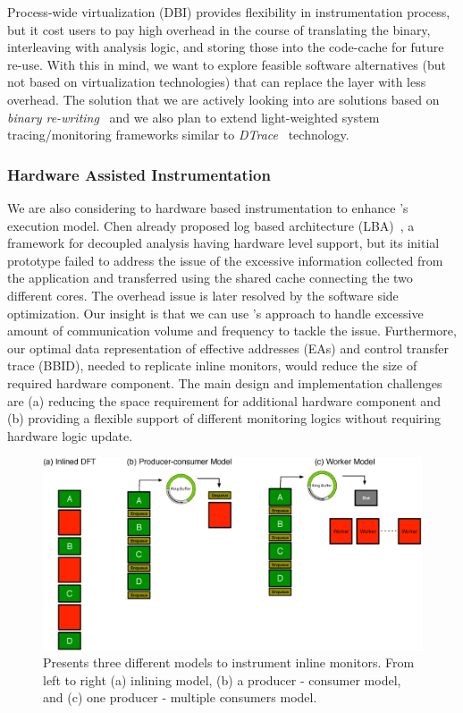 Process-wide virtualization (\ie DBI) provides flexibility in instrumentation
process, but it cost users to pay high overhead in the course of translating
the binary, interleaving with analysis logic, and storing those into the code-cache
for future re-use. With this in mind, we want to explore feasible
software alternatives (but not based on virtualization technologies)
that can replace the layer with less overhead. The solution that we are actively
looking into are solutions based on {\it binary re-writing}~\cite{cfi,
brewriting:usenix2003} and we also plan to extend light-weighted system
tracing/monitoring frameworks similar to {\it DTrace}~\cite{DTrace} technology.

\subsubsection{Hardware Assisted Instrumentation} 
\label{ssec:hw_inst}

We are also considering to hardware based instrumentation to enhance
\sreplica's execution model. Chen \etal already proposed log based architecture
(LBA)~\cite{lba:isca2008}, a framework for decoupled analysis having hardware
level support, but its initial prototype failed to address the issue of the
excessive information collected from the application and transferred using the
shared cache connecting the two different cores. The overhead issue is later
resolved by the software side optimization. 
%
Our insight is that we can use \sreplica's approach to handle excessive amount
of communication volume and frequency to tackle the issue. Furthermore, our
optimal data representation of effective addresses (EAs) and control transfer
trace (BBID), needed to replicate inline monitors, would reduce the size of
required hardware component.
%
The main design and implementation challenges are (a) reducing the space
requirement for additional hardware component and (b) providing a flexible
support of different monitoring logics without requiring hardware logic update.

\begin{figure}[tb]
    \centering
    \includegraphics[width=0.90\linewidth]{figs/model0.eps}

    \caption{Presents three different models to instrument inline monitors. From
    left to right (a) inlining model, (b) a producer -  consumer
    model, and (c) one producer - multiple consumers model.\label{fig:model0}}

\end{figure}

